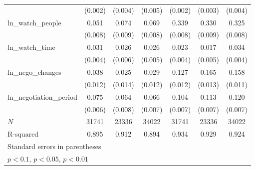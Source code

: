 {\begin{tabular}{l*{6}{c}}
            &     (0.002)         &     (0.004)         &     (0.005)         &     (0.002)         &     (0.003)         &     (0.004)         \\
\addlinespace
ln\_watch\_people&       0.051\sym{***}&       0.074\sym{***}&       0.069\sym{***}&       0.339\sym{***}&       0.330\sym{***}&       0.325\sym{***}\\
            &     (0.008)         &     (0.009)         &     (0.008)         &     (0.008)         &     (0.009)         &     (0.008)         \\
\addlinespace
ln\_watch\_time&       0.031\sym{***}&       0.026\sym{***}&       0.026\sym{***}&       0.023\sym{***}&       0.017\sym{***}&       0.034\sym{***}\\
            &     (0.004)         &     (0.006)         &     (0.005)         &     (0.004)         &     (0.005)         &     (0.004)         \\
\addlinespace
ln\_nego\_changes&       0.038\sym{***}&       0.025\sym{*}  &       0.029\sym{**} &       0.127\sym{***}&       0.165\sym{***}&       0.158\sym{***}\\
            &     (0.012)         &     (0.014)         &     (0.012)         &     (0.012)         &     (0.013)         &     (0.011)         \\
\addlinespace
ln\_negotiation\_period&       0.075\sym{***}&       0.064\sym{***}&       0.066\sym{***}&       0.104\sym{***}&       0.113\sym{***}&       0.120\sym{***}\\
            &     (0.006)         &     (0.008)         &     (0.007)         &     (0.007)         &     (0.007)         &     (0.007)         \\
\midrule
\(N\)       &       31741         &       23336         &       34022         &       31741         &       23336         &       34022         \\
R-squared   &       0.895         &       0.912         &       0.894         &       0.934         &       0.929         &       0.924         \\
\bottomrule
\multicolumn{7}{l}{\footnotesize Standard errors in parentheses}\\
\multicolumn{7}{l}{\footnotesize \sym{*} \(p<0.1\), \sym{**} \(p<0.05\), \sym{***} \(p<0.01\)}\\
\end{tabular}
}
